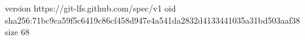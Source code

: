 version https://git-lfs.github.com/spec/v1
oid sha256:71bc9ca59f5c6419c86cf458d947e4a541da2832d4133441035a31bd503aaf38
size 68
